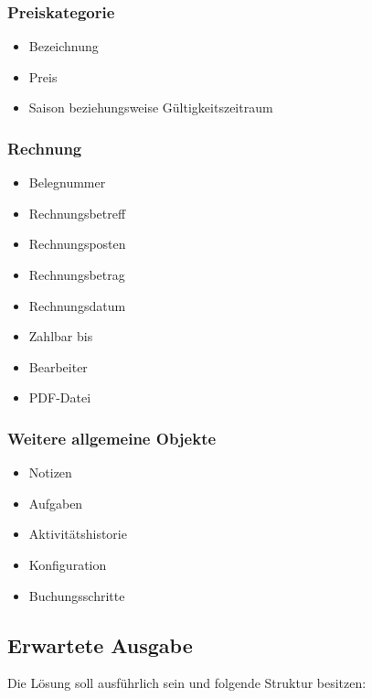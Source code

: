 \subsubsection{Preiskategorie}

\begin{itemize}
\item Bezeichnung
\item Preis
\item Saison beziehungsweise Gültigkeitszeitraum
\end{itemize}

\subsubsection{Rechnung}

\begin{itemize}
\item Belegnummer
\item Rechnungsbetreff
\item Rechnungsposten
\item Rechnungsbetrag
\item Rechnungsdatum
\item Zahlbar bis
\item Bearbeiter
\item PDF-Datei
\end{itemize}

\subsubsection{Weitere allgemeine Objekte}

\begin{itemize}
\item Notizen
\item Aufgaben
\item Aktivitätshistorie
\item Konfiguration
\item Buchungsschritte
\end{itemize}

\subsection{Erwartete Ausgabe}

Die Lösung soll ausführlich sein und folgende Struktur besitzen:

